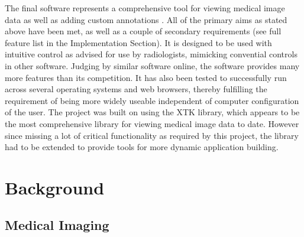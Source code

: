 \documentclass[a4paper,11pt,twoside]{article}
\begin{document}
The final software represents a comprehensive tool for viewing medical image data as well as adding custom annotations . All of the primary aims as stated above have been met, as well as a couple of secondary requirements (see full feature list in the Implementation Section). It is designed to be used with intuitive control as advised for use by radiologists, mimicking convential controls in other software. Judging by similar software online, the software provides many more features than its competition. It has also been tested to successfully run across several operating systems and web browsers, thereby fulfilling the requirement of being more widely useable independent of computer configuration of the user. The project was built on using the XTK library, which appears to be the most comprehensive library for viewing medical image data to date. However since missing a lot of critical functionality as required by this project, the library had to be extended to provide tools for more dynamic application building.

\newpage
\section{Background}



\subsection{Medical Imaging}
\end{document}
